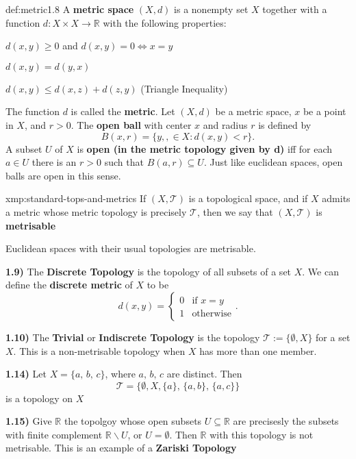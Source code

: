 \documentclass[landscape, 8pt]{extarticle}
\begin{document}
\begin{multicols}{3}
\begin{xmp}{def:metric}{1.8}
A \textbf{metric space} $(X, d)$ is a nonempty set $X$ together with a function $d : X \times X \to \mathbb{R}$ with the following properties:
\begin{enumerate-a-tight}
\item $d(x,y)\ge 0$ and $d(x,y)=0 \iff x = y$
\item $d(x,y)=d(y,x)$
\item $d(x,y)\le d(x,z)+d(z,y)$ (Triangle Inequality)
\end{enumerate-a-tight}
The function $d$ is called the \textbf{metric}.
\longrule{0.08ex}
Let $(X, d)$ be a metric space, $x$ be a point in $X$, and $r > 0$. The \textbf{open ball} with center $x$ and radius $r$ is defined by
\[B(x,r) = \{y,,\in X: d(x,y) < r\}.\]
A subset $U$ of $X$ is \textbf{open (in the metric topology given by d)} iff for each $a\in U$ there is an $r > 0$ such that $B(a,r) \subseteq U$. Just like euclidean spaces, open balls are open in this sense.
\end{xmp}

\begin{xmp}{xmp:standard-tops-and-metrics}{}
If $(X, \mathcal{T})$ is a topological space, and if $X$ admits a metric whose metric topology is precisely $\mathcal{T}$, then we say that $(X, \mathcal{T})$ is \textbf{metrisable}
\begin{itemize-tight}
\item Euclidean spaces with their usual topologies are metrisable.
\item[\textbf{1.9)}] The \textbf{Discrete Topology} is the topology of all subsets of a set $X$. We can define the \textbf{discrete metric} of $X$ to be
\[d(x, y) = \begin{cases}
		0 & \text{if } x = y \\
		1 & \text{otherwise}
	\end{cases}.\]
\item[\textbf{1.10)}] The \textbf{Trivial} or \textbf{Indiscrete Topology} is the topology $\mathcal{T} := \{\emptyset, X\}$ for a set $X$. This is a non-metrisable topology when $X$ has more than one member.
\item[\textbf{1.14)}] Let $X = \{a,\,b,\,c\}$, where $a,\,b,\,c$ are distinct. Then
\[\mathcal{T} = \{\emptyset, X, \{a\},\,\{a,b\},\,\{a,c\}\}\]
is a topology on $X$
\item[\textbf{1.15)}] Give $\mathbb{R}$ the topolgoy whose open subsets $U \subseteq \mathbb{R}$ are precisesly the subsets with finite complement $\mathbb{R} \backslash U$, or $U = \emptyset$. Then $\mathbb{R}$ with this topology is not metrisable. This is an example of a \textbf{Zariski Topology}
\end{itemize-tight}
\end{xmp}


\end{multicols}
\end{document}
